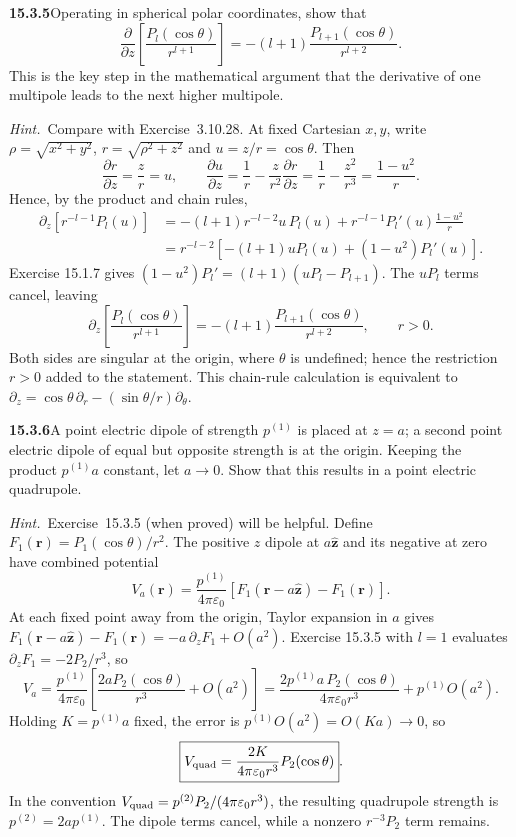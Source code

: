 \par\bigskip
\noindent\textbf{15.3.5}\quad Operating in spherical polar
coordinates, show that 
\[
\frac{\partial}{\partial z}\left[\frac{P_{l}(\cos\theta)}{r^{l+1}}\right]
=-(l+1)\frac{P_{l+1}(\cos\theta)}{r^{l+2}}.
\]
This is the key step in the mathematical argument that the derivative
of one multipole leads to the next higher multipole.
\par\emph{Hint.}~Compare with Exercise~3.10.28.
\solution
At fixed Cartesian $x,y$, write $\rho=\sqrt{x^2+y^2}$,
$r=\sqrt{\rho^2+z^2}$ and $u=z/r=\cos\theta$. Then
\[
\frac{\partial r}{\partial z}=\frac zr=u,\qquad
\frac{\partial u}{\partial z}=\frac1r-\frac z{r^2}\frac{\partial r}{\partial z}
=\frac1r-\frac{z^2}{r^3}=\frac{1-u^2}{r}.
\]
Hence, by the product and chain rules,
\begin{align*}
\partial_z\!\left[r^{-l-1}P_l(u)\right]
&=-(l+1)r^{-l-2}u\,P_l(u)+r^{-l-1}P_l'(u)\frac{1-u^2}r\\
&=r^{-l-2}\left[-(l+1)uP_l(u)+(1-u^2)P_l'(u)\right].
\end{align*}
Exercise 15.1.7 gives
$(1-u^2)P_l'=(l+1)(uP_l-P_{l+1})$.
The $uP_l$ terms cancel, leaving
\[
\boxed{\partial_z\!\left[\frac{P_l(\cos\theta)}{r^{l+1}}\right]
=-(l+1)\frac{P_{l+1}(\cos\theta)}{r^{l+2}}},\qquad r>0.
\]
Both sides are singular at the origin, where $\theta$ is undefined;
hence the restriction $r>0$ added to the statement.
This chain-rule calculation is equivalent to
$\partial_z=\cos\theta\,\partial_r-(\sin\theta/r)\partial_\theta$.

\par\bigskip
\noindent\textbf{15.3.6}\quad A point electric dipole of strength
$p^{(1)}$ is placed at $z=a$; a second point electric dipole of equal
but opposite strength is at the origin. Keeping the product
$p^{(1)}a$ constant, let $a\to0$. Show that this results in a point
electric quadrupole.
\par\emph{Hint.}~Exercise~15.3.5 (when proved) will be helpful.
\solution
Define $F_1(\mathbf r)=P_1(\cos\theta)/r^2$.
The positive $z$ dipole at $a\hat{\mathbf z}$ and its negative at zero
have combined potential
\[
V_a(\mathbf r)=\frac{p^{(1)}}{4\pi\varepsilon_0}
[F_1(\mathbf r-a\hat{\mathbf z})-F_1(\mathbf r)].
\]
At each fixed point away from the origin, Taylor expansion in $a$ gives
$F_1(\mathbf r-a\hat{\mathbf z})-F_1(\mathbf r)
=-a\,\partial_zF_1+O(a^2)$.
Exercise 15.3.5 with $l=1$ evaluates $\partial_zF_1=-2P_2/r^3$, so
\[
V_a=\frac{p^{(1)}}{4\pi\varepsilon_0}
\left[\frac{2aP_2(\cos\theta)}{r^3}+O(a^2)\right]
=\frac{2p^{(1)}a\,P_2(\cos\theta)}{4\pi\varepsilon_0r^3}
+p^{(1)}O(a^2).
\]
Holding $K=p^{(1)}a$ fixed, the error is $p^{(1)}O(a^2)=O(Ka)\to0$, so
\[
\boxed{V_{\rm quad}=\frac{2K}{4\pi\varepsilon_0r^3}
P_2(\cos\theta)}.
\]
In the convention $V_{\rm quad}=p^{(2)}P_2/(4\pi\varepsilon_0r^3)$,
the resulting quadrupole strength is $p^{(2)}=2ap^{(1)}$.
The dipole terms cancel, while a nonzero $r^{-3}P_2$ term remains.

